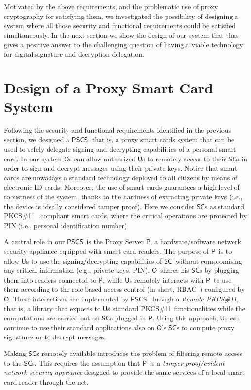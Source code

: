 \documentclass[preprint,authoryear,12pt]{elsarticle}
\newcommand{\Owner}{\ensuremath{\mathsf{O}}}
\newcommand{\User}{\ensuremath{\mathsf{U}}}
\newcommand{\Proxy}{\ensuremath{\mathsf{P}}}
\newcommand{\SC}{\ensuremath{\mathsf{SC}}}
\newcommand{\PSCS}{\ensuremath{\mathsf{PSCS}}}
\begin{document}
Motivated by the above requirements, and the problematic use of proxy cryptography for satisfying them, we investigated the possibility of designing a system where all those security and functional requirements could be satisfied simultaneously. In the next section we show the design of our system that thus gives a positive answer to the challenging question of having a viable technology for digital signature and decryption delegation. 

\section{Design of a Proxy Smart Card System}
\label{pcsc}
Following the security and functional requirements identified in the previous section, we designed a \PSCS , that is, a proxy smart cards system that can be used to safely delegate signing and decrypting capabilities of a personal smart card. In our system \Owner s can allow authorized \User s to remotely access to their \SC s in order to sign and decrypt messages using their private keys. Notice that smart cards are nowadays a standard technology deployed to all citizens by means of electronic ID cards. Moreover, the use of smart cards guarantees a high level of robustness of the system, thanks to the hardness of extracting private keys (i.e., the device is ideally considered tamper proof). Here we consider \SC s as standard PKCS\#11~\citep{PKCS11} compliant smart cards, where the critical operations are protected by PIN (i.e., personal identification number).

A central role in our \PSCS\ is the Proxy Server \Proxy, a hardware/software network security appliance equipped with smart card readers. The purpose of \Proxy\ is to allow \User s to use the signing/decrypting capabilities of \SC\ without compromising any critical information (e.g., private keys, PIN).  \Owner\ shares his \SC s by plugging them into readers connected to \Proxy, while \User s remotely interacts with \Proxy\ to use them according to the role-based access control (in short, RBAC~\citep{RBAC}) configured by \Owner . These interactions are implemented by \PSCS\ through a \emph{Remote PKCS\#11}, that is, a library that exposes to \User s standard PKCS\#11 functionalities while the computations are carried out on \SC s plugged in \Proxy . Using this approach, \User s can continue to use their standard applications also on \Owner 's \SC s to compute proxy signatures or to decrypt messages.

Making \SC s remotely available introduces the problem of filtering remote access to the \SC s. This requires the assumption that \Proxy\  is a {\sl tamper proof/evident network security appliance} designed to provide the same services of a local smart card reader through the net. 
\end{document}
